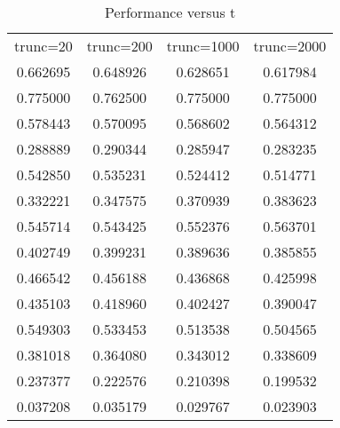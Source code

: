 \documentclass[11pt]{article}
\begin{document}
\begin{table}[htbp]
  \centering
  \begin{tabular}{cccc}
trunc=20 & trunc=200 & trunc=1000 & trunc=2000 \\
0.662695 & 0.648926 & 0.628651 & 0.617984  \\
0.775000 & 0.762500 & 0.775000 & 0.775000  \\
0.578443 & 0.570095 & 0.568602 & 0.564312  \\
0.288889 & 0.290344 & 0.285947 & 0.283235  \\
0.542850 & 0.535231 & 0.524412 & 0.514771  \\
0.332221 & 0.347575 & 0.370939 & 0.383623  \\
0.545714 & 0.543425 & 0.552376 & 0.563701  \\
0.402749 & 0.399231 & 0.389636 & 0.385855  \\
0.466542 & 0.456188 & 0.436868 & 0.425998  \\
0.435103 & 0.418960 & 0.402427 & 0.390047  \\
0.549303 & 0.533453 & 0.513538 & 0.504565  \\
0.381018 & 0.364080 & 0.343012 & 0.338609  \\
0.237377 & 0.222576 & 0.210398 & 0.199532  \\
0.037208 & 0.035179 & 0.029767 & 0.023903  \\
  \end{tabular} 
  \caption{Performance versus t}
  \label{tab:t}
\end{table}
\end{document}
